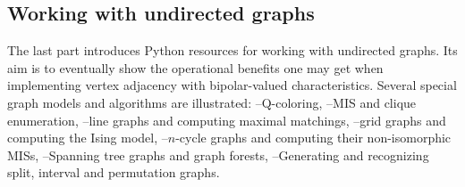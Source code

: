 % 
%
%

\begin{partbacktext}
\part{Working with undirected graphs}
\noindent The last part introduces Python resources for working with undirected graphs. Its aim is to eventually show the operational benefits one may get when implementing vertex adjacency with bipolar-valued characteristics. Several special graph models and algorithms are illustrated: --Q-coloring, --MIS and clique enumeration, --line graphs and computing maximal matchings, --grid graphs and computing the Ising model, --$n$-cycle graphs and computing their non-isomorphic MISs, --Spanning tree graphs and graph forests, --Generating and recognizing split, interval and permutation graphs.
\end{partbacktext}